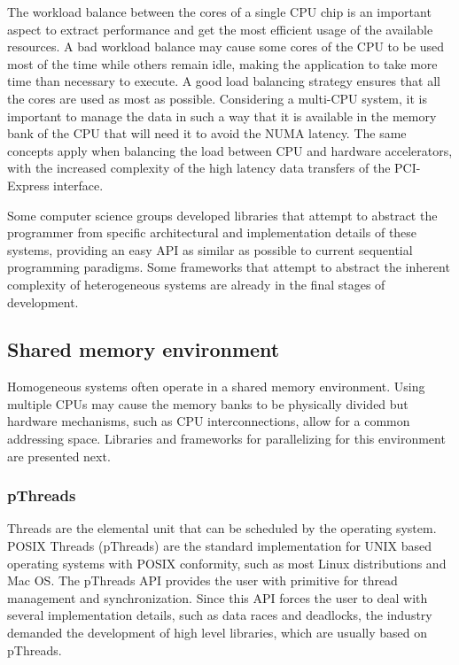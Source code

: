 The workload balance between the cores of a single CPU chip is an important aspect to extract performance and get the most efficient usage of the available resources. A bad workload balance may cause some cores of the CPU to be used most of the time while others remain idle, making the application to take more time than necessary to execute. A good load balancing strategy ensures that all the cores are used as most as possible. Considering a multi-CPU system, it is important to manage the data in such a way that it is available in the memory bank of the CPU that will need it to avoid the NUMA latency. The same concepts apply when balancing the load between CPU and hardware accelerators, with the increased complexity of the high latency data transfers of the PCI-Express interface.

Some computer science groups developed libraries that attempt to abstract the programmer from specific architectural and implementation details of these systems, providing an easy API as similar as possible to current sequential programming paradigms. Some frameworks that attempt to abstract the inherent complexity of heterogeneous systems are already in the final stages of development.

\subsection{Shared memory environment}

Homogeneous systems often operate in a shared memory environment. Using multiple CPUs may cause the memory banks to be physically divided but hardware mechanisms, such as CPU interconnections, allow for a common addressing space. Libraries and frameworks for parallelizing for this environment are presented next.

\subsubsection*{pThreads}
\label{pThreads}

Threads are the elemental unit that can be scheduled by the operating system. POSIX Threads (pThreads) are the standard implementation for UNIX based operating systems with POSIX conformity, such as most Linux distributions and Mac OS. The pThreads API provides the user with primitive for thread management and synchronization. Since this API forces the user to deal with several implementation details, such as data races and deadlocks, the industry demanded the development of high level libraries, which are usually based on pThreads.

